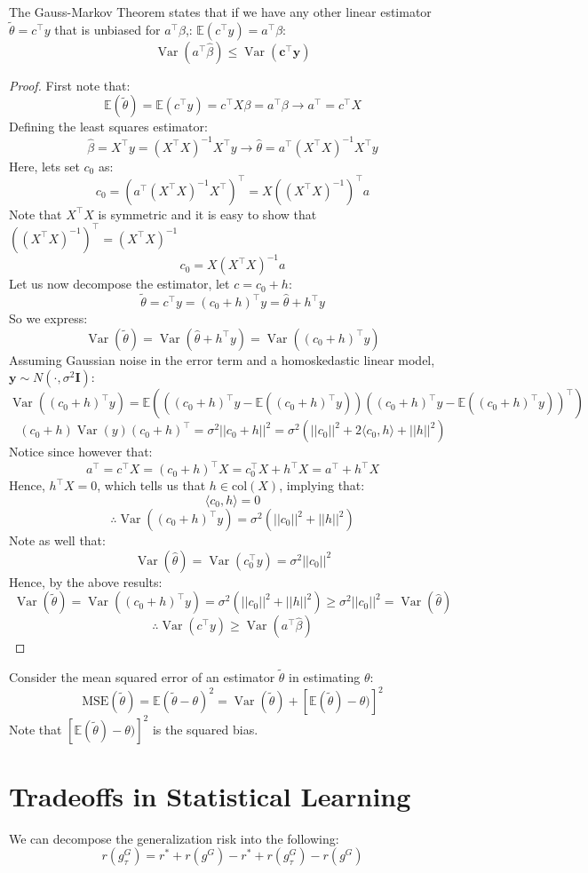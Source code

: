 \documentclass[12pt]{article}
\begin{document}
The Gauss-Markov Theorem states that if we have any other linear estimator $\tilde{\theta} = c^\top y$ that is unbiased for $a^\top \beta $,: $\mathbb{E}(c^\top y) = a^\top \beta$:
\[\operatorname{Var}(a^\top \hat{\beta}) \leq \operatorname{Var}(\mathbf{c}^\top \mathbf{y})\]
\begin{proof}
First note that:
\[\mathbb{E}(\tilde{\theta}) = \mathbb{E}(c^\top y)= c^\top X\beta = a^\top \beta \rightarrow a^\top = c^\top X\]
Defining the least squares estimator:
\[\hat{\beta} = X^\top y = (X^\top X)^{-1}X^\top y \rightarrow \hat{\theta} = a^\top(X^\top X)^{-1}X^\top y  \]
Here, lets set $c_0$ as:
\[c_0 = (a^\top (X^\top X)^{-1}X^\top)^\top = X((X^\top X)^{-1})^\top a\]
Note that $X^\top X$ is symmetric and it is easy to show that $((X^\top X)^{-1})^\top = (X^\top X)^{-1}$
\[c_0 = X(X^\top X)^{-1}a\]
Let us now decompose the estimator, let $c =c_0 + h$:
\[\tilde{\theta} = c^\top y = (c_0+h)^\top y = \hat{\theta} + h^\top y\]
So we express:
\[\operatorname{Var}(\tilde{\theta}) = \operatorname{Var}(\hat{\theta} + h^\top y) = \operatorname{Var}((c_0+h)^\top y)\]
Assuming Gaussian noise in the error term and a homoskedastic linear model, $\mathbf{y} \sim N(\cdot, \sigma^2\mathbf{I})$:
\[\operatorname{Var}((c_0+h)^\top y) = \mathbb{E}(((c_0+h)^\top y - \mathbb{E}((c_0+h)^\top y))((c_0+h)^\top y - \mathbb{E}((c_0+h)^\top y))^\top)\]
\[(c_0+h)\operatorname{Var}(y)(c_0+h)^\top = \sigma^2 ||c_0+h||^2 = \sigma^2(||c_0||^2+2\langle c_0,h \rangle + ||h||^2)\]
Notice since however that:
\[a^\top = c^\top X = (c_0+h)^\top X = c_0^\top X + h^\top X = a^\top + h^\top X \]
Hence, $h^\top X = 0$, which tells us that $h \in \text{col}(X)$, implying that:
\[\langle c_0, h \rangle = 0\]
\[\therefore \operatorname{Var}((c_0+h)^\top y) = \sigma^2(||c_0||^2+ ||h||^2)\]
Note as well that:
\[\operatorname{Var}(\hat{\theta}) = \operatorname{Var}(c_0^\top y) = \sigma^2 ||c_0||^2\]
Hence, by the above results:
\[\operatorname{Var}(\tilde{\theta}) = \operatorname{Var}((c_0+h)^\top y) = \sigma^2(||c_0||^2+ ||h||^2) \geq \sigma^2 ||c_0||^2 = \operatorname{Var}(\hat{\theta}) \]
\[\therefore \operatorname{Var}(c^\top y) \geq \operatorname{Var}(a^\top \hat{\beta})\]
\end{proof}
Consider the mean squared error of an estimator $\tilde{\theta}$ in estimating $\theta$:
\[\text{MSE}(\tilde\theta) = \mathbb{E}(\tilde\theta-\theta)^2 = \operatorname{Var}(\tilde\theta) + [\mathbb{E}(\tilde\theta)-\theta)]^2\]
Note that $[\mathbb{E}(\tilde\theta)-\theta)]^2$ is the squared bias.
\section{Tradeoffs in Statistical Learning}
We can decompose the generalization risk into the following:
\[r(g^G_\tau) = r^* + r(g^G)-r^* + r(g^G_\tau)-r(g^G)\]
\end{document}
